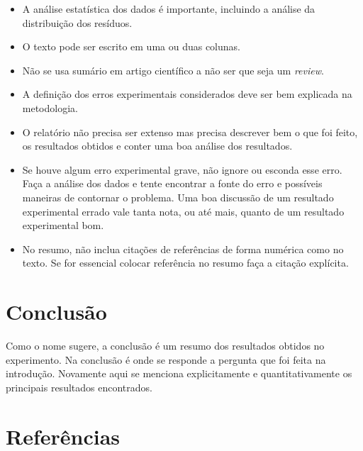 \documentclass[reprint,amsmath,amssymb,aps,prl,floatfix,onecolumn]{revtex4-2}
\begin{document}
\begin{itemize}
	\item A análise estatística dos dados é importante, incluindo a análise da distribuição dos resíduos.
	
	\item O texto pode ser escrito em uma ou duas colunas.
	
	\item Não se usa sumário em artigo científico a não ser que seja um \textit{review}.
	
	\item A definição dos erros experimentais considerados deve ser bem explicada na metodologia.
	
	\item O relatório não precisa ser extenso mas precisa descrever bem o que foi feito, os resultados obtidos e conter uma boa análise dos resultados.
	
	\item Se houve algum erro experimental grave, não ignore ou esconda esse erro. Faça a análise dos dados e tente encontrar a fonte do erro e possíveis maneiras de contornar o problema. Uma boa discussão de um resultado experimental errado vale tanta nota, ou até mais, quanto de um resultado experimental bom.  
	  
	\item No resumo, não inclua citações de referências de forma numérica como no texto. Se for essencial colocar referência no resumo faça a citação explícita.
	
\end{itemize}


\section{Conclusão}	
	
Como o nome sugere, a conclusão é um resumo dos resultados obtidos no experimento. Na conclusão é onde se responde a pergunta que foi feita na introdução. Novamente aqui se menciona explicitamente  e quantitativamente os principais resultados encontrados.
	
\section*{Referências}

	
	
	
	
\end{document}
